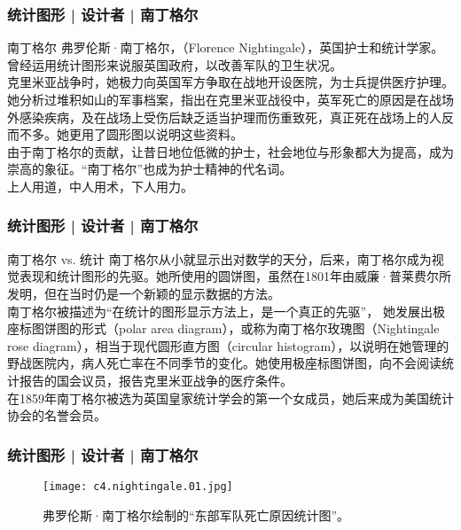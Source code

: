 \begin{frame}
  \frametitle{统计图形 | 设计者 | 南丁格尔}
  \begin{block}{南丁格尔}
    弗罗伦斯·南丁格尔，（Florence Nightingale），英国护士和统计学家。曾经运用统计图形来说服英国政府，以改善军队的卫生状况。\\
    \vspace{0.5em}
克里米亚战争时，她极力向英国军方争取在战地开设医院，为士兵提供医疗护理。她分析过堆积如山的军事档案，指出在克里米亚战役中，英军死亡的原因是在战场外感染疾病，及在战场上受伤后缺乏适当护理而伤重致死，真正死在战场上的人反而不多。她更用了圆形图以说明这些资料。\\
    \vspace{0.5em}
由于南丁格尔的贡献，让昔日地位低微的护士，社会地位与形象都大为提高，成为崇高的象征。“南丁格尔”也成为护士精神的代名词。\\
    \vspace{0.5em}
    \alert{上人用道，中人用术，下人用力。}
  \end{block}
\end{frame}

\begin{frame}
  \frametitle{统计图形 | 设计者 | 南丁格尔}
  \begin{block}{南丁格尔 vs. 统计}
南丁格尔从小就显示出对数学的天分，后来，南丁格尔成为视觉表现和统计图形的先驱。她所使用的圆饼图，虽然在1801年由威廉·普莱费尔所发明，但在当时仍是一个新颖的显示数据的方法。\\
\vspace{0.5em}
南丁格尔被描述为“在统计的图形显示方法上，是一个真正的先驱”， 她发展出极座标图饼图的形式（polar area diagram），或称为南丁格尔玫瑰图（Nightingale rose diagram），相当于现代圆形直方图（circular histogram），以说明在她管理的野战医院内，病人死亡率在不同季节的变化。她使用极座标图饼图，向不会阅读统计报告的国会议员，报告克里米亚战争的医疗条件。\\
\vspace{0.5em}
在1859年南丁格尔被选为英国皇家统计学会的第一个女成员，她后来成为美国统计协会的名誉会员。
  \end{block}
\end{frame}

\begin{frame}
  \frametitle{统计图形 | 设计者 | 南丁格尔}
  \begin{figure}
    \centering
    \texttt{[image: c4.nightingale.01.jpg]}
    \caption{弗罗伦斯·南丁格尔绘制的“东部军队死亡原因统计图”。}
  \end{figure}
\end{frame}

